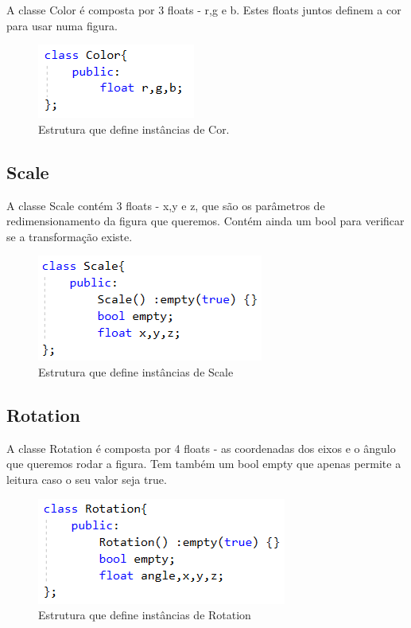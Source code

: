 \documentclass[a4paper]{article}
\begin{document}
A classe Color é composta por 3 floats - r,g e b. Estes floats juntos definem a cor para usar numa figura.

\begin{figure}[H]
\centering
\includegraphics[scale=0.8]{color.png}
\caption{Estrutura que define instâncias de Cor.}
\label{img:Color}
\end{figure}


\subsection{Scale}
\label{sec:scale}

A classe Scale contém 3 floats - x,y e z, que são os parâmetros de redimensionamento da figura que queremos. Contém ainda um bool para verificar se a transformação existe.

\begin{figure}[H]
\centering
\includegraphics[scale=0.8]{scale.png}
\caption{Estrutura que define instâncias de Scale}
\label{img:Scale}
\end{figure}


\subsection{Rotation}
\label{sec:rotation}

A classe Rotation é composta por 4 floats - as coordenadas dos eixos e o ângulo que queremos rodar a figura. Tem também um bool empty que apenas permite a leitura caso o seu valor seja true.

\begin{figure}[H]
\centering
\includegraphics[scale=0.8]{rotation.png}
\caption{Estrutura que define instâncias de Rotation}
\label{img:Rotation}
\end{figure}
\end{document}
